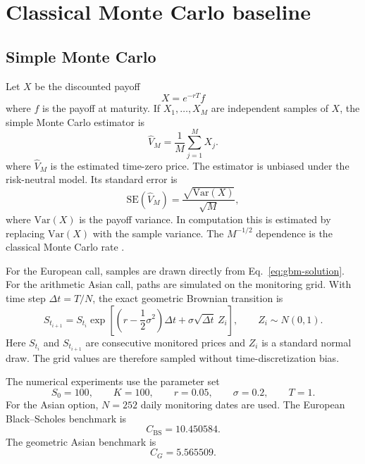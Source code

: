 \documentclass[12pt]{article}
\begin{document}
\section{Classical Monte Carlo baseline}

\subsection{Simple Monte Carlo}

Let $X$ be the discounted payoff
\begin{equation}
    X = e^{-rT}f
\end{equation}
where $f$ is the payoff at maturity.  If $X_1,\ldots,X_M$ are independent samples of $X$, the simple Monte Carlo estimator is
\begin{equation}
    \widehat V_M
    =
    \frac{1}{M}\sum_{j=1}^{M}X_j.
    \label{eq:mc-estimator}
\end{equation}
where $\widehat V_M$ is the estimated time-zero price.  The estimator is unbiased under the risk-neutral model.  Its standard error is
\begin{equation}
    \mathrm{SE}(\widehat V_M)
    =
    \frac{\sqrt{\mathrm{Var}(X)}}{\sqrt{M}},
    \label{eq:mc-se}
\end{equation}
where $\mathrm{Var}(X)$ is the payoff variance.  In computation this is estimated by replacing $\mathrm{Var}(X)$ with the sample variance.  The $M^{-1/2}$ dependence is the classical Monte Carlo rate \cite{stamatopoulosOptionPricingUsing2020,xuPricingArithmeticAverage2023}.

For the European call, samples are drawn directly from Eq.~\eqref{eq:gbm-solution}.  For the arithmetic Asian call, paths are simulated on the monitoring grid.  With time step $\Delta t=T/N$, the exact geometric Brownian transition is
\begin{equation}
    S_{t_{i+1}}
    =
    S_{t_i}
    \exp\!\left[
        \left(r-\frac{1}{2}\sigma^2\right)\Delta t
        + \sigma\sqrt{\Delta t}\,Z_i
    \right],
    \qquad Z_i\sim N(0,1).
    \label{eq:gbm-step}
\end{equation}
Here $S_{t_i}$ and $S_{t_{i+1}}$ are consecutive monitored prices and $Z_i$ is a standard normal draw.  The grid values are therefore sampled without time-discretization bias.

The numerical experiments use the parameter set
\begin{equation}
    S_0=100,\qquad K=100,\qquad r=0.05,\qquad \sigma=0.2,\qquad T=1.
\end{equation}
For the Asian option, $N=252$ daily monitoring dates are used.  The European Black--Scholes benchmark is
\begin{equation}
    C_{\mathrm{BS}}=10.450584.
\end{equation}
The geometric Asian benchmark is
\begin{equation}
    C_G=5.565509.
\end{equation}
\end{document}
